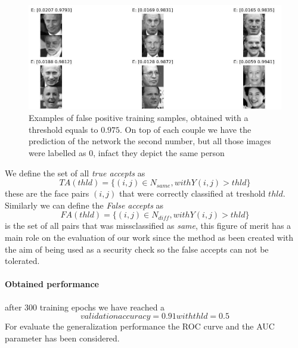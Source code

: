 \begin{figure}[t]
\includegraphics[width=1\linewidth]{images/falsepositive.jpg}
   \caption{Examples of false positive training samples, obtained with a threshold equals to $0.975$. On top of each couple we have the prediction of the network \ie the second number, but all those images were labelled as 0, infact they depict the same person}
\label{fig:long}
\label{fig:onecol}
\end{figure} 
 
We define the set of all \textit{true accepts} as
\begin{equation}
TA(thld)=\{(i,j) \in N_{same}, with Y(i,j) > thld\}
\end{equation}
these are the face pairs $(i,j)$ that were correctly classified at treshold $thld$.
Similarly we can define the \textit{False accepts} as 
\begin{equation}
FA(thld)=\{(i,j) \in N_{diff}, with Y(i,j) > thld\} 
\end{equation}
is the set of all pairs that was missclassified as \textit{same}, this figure of merit has a main role on the evaluation of our work since the method as been created with the aim of being used as a security check so the false accepts can not be tolerated.
\paragraph{Obtained performance}
after 300 training epochs we have reached a
\begin{equation}
validationaccuracy = 0.91 with thld = 0.5
\end{equation}
For evaluate the generalization performance the ROC curve and the AUC parameter has been considered.

